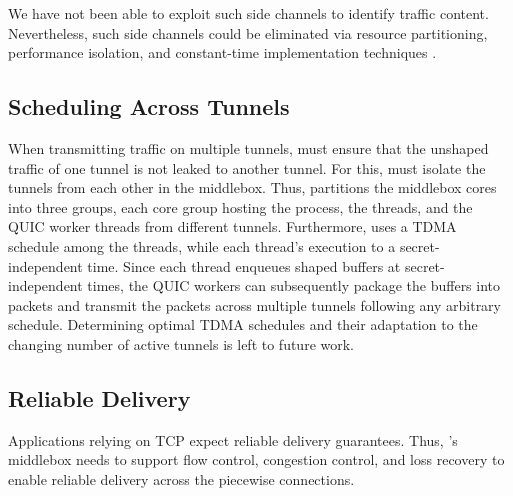 We have not been able to exploit such side channels to identify traffic content.
Nevertheless, such side channels could be eliminated via resource partitioning,
performance isolation, and constant-time implementation techniques
\cite{liu2016catalyst, coppens2009practical, zhang2011predinteractive,
    almeida2016verifying}.



\subsection{Scheduling Across Tunnels}
{When transmitting traffic on multiple tunnels, {\sys} must ensure that the
unshaped traffic of one tunnel is not leaked to another tunnel. For this, {\sys}
must isolate the tunnels from each other in the middlebox.
Thus, {\sys} partitions the middlebox cores into three groups, each core group
hosting the {\ushaper} process, the {\prepare} threads, and the QUIC worker
threads from different tunnels.
Furthermore, {\sys} uses a TDMA schedule among the {\prepare} threads, while
 each thread's execution to a secret-independent time.
Since each {\prepare} thread enqueues shaped buffers at secret-independent
times, the QUIC workers can subsequently package the buffers into packets and
transmit the packets across multiple tunnels following any arbitrary schedule.}
%
{Determining optimal TDMA schedules and their adaptation to the changing
number of active tunnels is left to future work.}

\subsection{Reliable Delivery}
Applications relying on TCP expect reliable delivery guarantees. Thus, {\sys}'s
middlebox needs to support flow control, congestion control, and loss recovery
to enable reliable delivery across the piecewise connections.

